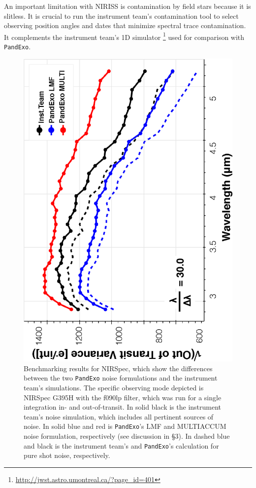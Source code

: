 \documentclass[iop]{emulateapj}
\begin{document}
An important limitation with NIRISS is contamination by field stars because it is slitless. It is crucial to run the instrument team's contamination tool to select observing position angles and dates that minimize spectral trace contamination. It complements the instrument team's 1D simulator \footnote{\url{http://jwst.astro.umontreal.ca/?page\_id=401}} used for comparison with \texttt{PandExo}.
\begin{figure}[ht]
 \includegraphics[angle=270,origin=c,width=\linewidth]{fig7.eps}
\caption{Benchmarking results for NIRSpec, which show the differences between the two \texttt{PandExo} noise formulations and the instrument team's simulations. The specific observing mode depicted is NIRSpec G395H with the f090lp filter, which was run for a single integration in- and out-of-transit. In solid black is the instrument team's noise simulation, which includes all pertinent sources of noise. In solid blue and red is \texttt{PandExo}'s LMF and MULTIACCUM noise formulation, respectively (see discussion in \S3). In dashed blue and black is the instrument team's and \texttt{PandExo}'s calculation for pure shot noise, respectively. \label{fig7}}
\end{figure}
\end{document}
